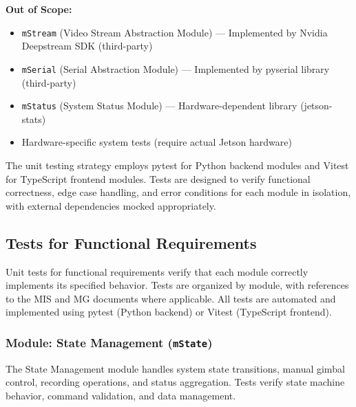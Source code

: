 \documentclass[12pt, titlepage]{article}
\newcommand{\mref}[1]{\texttt{#1}}
\begin{document}
\textbf{Out of Scope:}
\begin{itemize}
  \item \mref{mStream} (Video Stream Abstraction Module) --- Implemented by Nvidia Deepstream SDK (third-party)
  \item \mref{mSerial} (Serial Abstraction Module) --- Implemented by pyserial library (third-party)
  \item \mref{mStatus} (System Status Module) --- Hardware-dependent library (jetson-stats)
  \item Hardware-specific system tests (require actual Jetson hardware)
\end{itemize}

The unit testing strategy employs pytest for Python backend modules and Vitest
for TypeScript frontend modules. Tests are designed to verify functional
correctness, edge case handling, and error conditions for each module in
isolation, with external dependencies mocked appropriately.

\subsection{Tests for Functional Requirements}

Unit tests for functional requirements verify that each module correctly
implements its specified behavior. Tests are organized by module, with
references to the MIS and MG documents where applicable. All tests are
automated and implemented using pytest (Python backend) or Vitest (TypeScript
frontend).

\subsubsection{Module: State Management (\mref{mState})}

The State Management module handles system state transitions, manual gimbal
control, recording operations, and status aggregation. Tests verify state
machine behavior, command validation, and data management.
\end{document}
